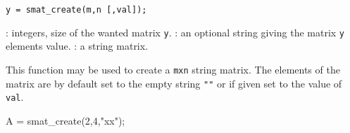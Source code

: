 
\begin{mandesc}
\end{mandesc}

\begin{calling_sequence}
\begin{verbatim}
y = smat_create(m,n [,val]);
\end{verbatim}
\end{calling_sequence}
\begin{parameters}
  \begin{varlist}
     : integers, size of the wanted matrix \verb!y!.
     : an optional string giving the matrix \verb!y! elements value.
       : a string matrix.
  \end{varlist}
\end{parameters}

\begin{mandescription}
  This function may be used to create a \verb+mxn+ string matrix. 
  The elements of the matrix are by default set to the empty string \verb+""+ 
  or if given set to the value of \verb+val+.
\end{mandescription}

\begin{examples}
  \begin{program}
    A = smat_create(2,4,"xx");
  \end{program}
\end{examples}

